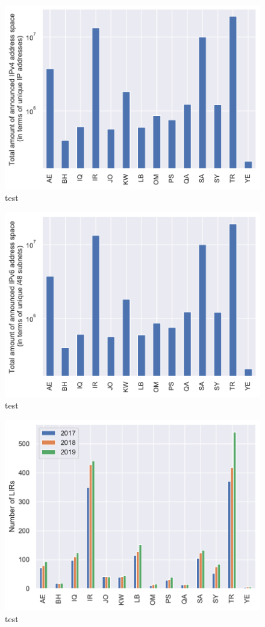 \documentclass[a4paper,titlepage]{article}
\begin{document}
\begin{figure}
    \centering
    \includegraphics[width=0.75\linewidth]{../output/ips-v4.pdf}
    \caption{test}
\end{figure}

\begin{figure}
    \centering
    \includegraphics[width=0.75\linewidth]{../output/48s-v6.pdf}
    \caption{test}
\end{figure}

\begin{figure}
    \centering
    \includegraphics[width=0.75\linewidth]{../output/lir.pdf}
    \caption{test}
\end{figure}
\end{document}
